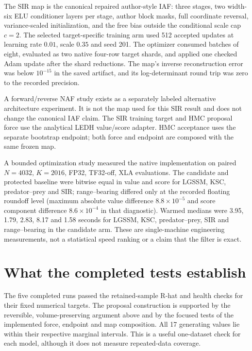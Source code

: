 The SIR map is the canonical repaired author-style IAF: three stages, two
width-six ELU conditioner layers per stage, author block masks, full coordinate
reversal, variance-scaled initialization, and the free bias outside the
conditional scale cap $c=2$.  The selected target-specific training arm used
512 accepted updates at learning rate $0.01$, scale $0.35$ and seed 201.  The
optimizer consumed batches of eight, evaluated as two native four-row target
shards, and applied one checked Adam update after the shard reductions.  The
map's inverse reconstruction error was below $10^{-15}$ in the saved artifact,
and its log-determinant round trip was zero to the recorded precision.

A forward/reverse NAF study exists as a separately labeled alternative
architecture experiment.  It is not the map used for this SIR result and does
not change the canonical IAF claim.  The SIR training target and HMC proposal force use the analytical LEDH
value/score adapter.  HMC acceptance uses the separate bootstrap endpoint;
both force and endpoint are composed with the same frozen map.

A bounded optimization study measured the native implementation on paired
$N=4032$, $K=2016$, FP32, TF32-off, XLA evaluations.  The candidate and
protected baseline were bitwise equal in value and score for LGSSM, KSC,
predator--prey and SIR; range--bearing differed only at the recorded floating
roundoff level (maximum absolute value difference $8.8\times10^{-5}$ and score
component difference $8.6\times10^{-4}$ in that diagnostic).  Warmed medians
were 3.95, 1.79, 2.83, 8.17 and 1.58 seconds for LGSSM, KSC, predator--prey,
SIR and range--bearing in the candidate arm.  These are single-machine
engineering measurements, not a statistical speed ranking or a claim that the
filter is exact.

\section{What the completed tests establish}
\label{sec:bf-surrogate-boundaries}

The five completed runs passed the retained-sample R-hat and health checks
for their fixed numerical targets.  The proposal construction is supported by
the reversible, volume-preserving argument above and by the focused tests of
the implemented force, endpoint and map composition.  All 17 generating
values lie within their respective marginal intervals.  This is a useful
one-dataset check for each model, although it does not measure repeated-data
coverage.

